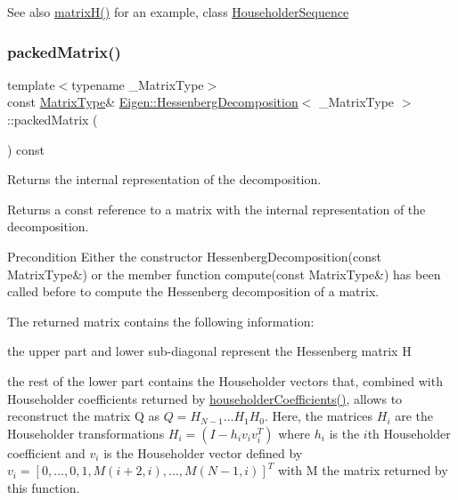\begin{DoxySeeAlso}{See also}
\mbox{\hyperlink{class_eigen_1_1_hessenberg_decomposition_a8e781d2e22a2304647bcf0ae913cc8ea}{matrix\+H()}} for an example, class \mbox{\hyperlink{class_eigen_1_1_householder_sequence}{Householder\+Sequence}} 
\end{DoxySeeAlso}
\mbox{\label{class_eigen_1_1_hessenberg_decomposition_a1f72b7612fd4edc5a6f31005e433e1dd}} 
\subsubsection{\texorpdfstring{packedMatrix()}{packedMatrix()}}
{\footnotesize\ttfamily template$<$typename \+\_\+\+Matrix\+Type$>$ \\
const \mbox{\hyperlink{class_eigen_1_1_hessenberg_decomposition_a93a611350a7db9d1da18f2c828ecea9f}{Matrix\+Type}}\& \mbox{\hyperlink{class_eigen_1_1_hessenberg_decomposition}{Eigen\+::\+Hessenberg\+Decomposition}}$<$ \+\_\+\+Matrix\+Type $>$\+::packed\+Matrix (\begin{DoxyParamCaption}{ }\end{DoxyParamCaption}) const\hspace{0.3cm}{\ttfamily [inline]}}



Returns the internal representation of the decomposition. 

\begin{DoxyReturn}{Returns}
a const reference to a matrix with the internal representation of the decomposition.
\end{DoxyReturn}
\begin{DoxyPrecond}{Precondition}
Either the constructor Hessenberg\+Decomposition(const Matrix\+Type\&) or the member function compute(const Matrix\+Type\&) has been called before to compute the Hessenberg decomposition of a matrix.
\end{DoxyPrecond}
The returned matrix contains the following information\+:
\begin{DoxyItemize}
\item the upper part and lower sub-\/diagonal represent the Hessenberg matrix H
\item the rest of the lower part contains the Householder vectors that, combined with Householder coefficients returned by \mbox{\hyperlink{class_eigen_1_1_hessenberg_decomposition_a65fa81ce79d956baa59a30a6d82f8a84}{householder\+Coefficients()}}, allows to reconstruct the matrix Q as $ Q = H_{N-1} \ldots H_1 H_0 $. Here, the matrices $ H_i $ are the Householder transformations $ H_i = (I - h_i v_i v_i^T) $ where $ h_i $ is the $ i $th Householder coefficient and $ v_i $ is the Householder vector defined by $ v_i = [ 0, \ldots, 0, 1, M(i+2,i), \ldots, M(N-1,i) ]^T $ with M the matrix returned by this function.
\end{DoxyItemize}

